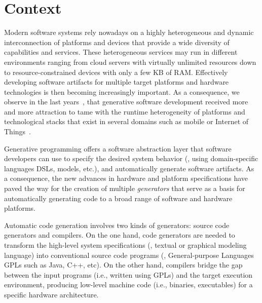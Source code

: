 

\section{Context}
Modern software systems rely nowadays on a highly heterogeneous and dynamic interconnection of platforms and devices that provide a wide diversity of capabilities and services. These heterogeneous services may run in different environments ranging from cloud servers with virtually unlimited resources down to resource-constrained devices with only a few KB of RAM. Effectively developing software artifacts for multiple target platforms and hardware technologies is then becoming increasingly important. As a consequence, we observe in the last years~\cite{Czarnecki:2000:GPM:345203}, that generative software development received more and more attraction to tame with the runtime heterogeneity of platforms and technological stacks that exist in several domains such as mobile or Internet of Things~\cite{betz2011improving}.

Generative programming offers a software abstraction layer that software developers can use to specify the desired system behavior (\eg, using domain-specific languages DSLs, models, etc.), and automatically generate software artifacts. As a consequence, the new advances in hardware and platform specifications have paved the way for the creation of multiple \textit{generators} that serve as a basis for automatically generating code to a broad range of software and hardware platforms. 


Automatic code generation involves two kinds of generators: source code generators and compilers.
On the one hand, code generators are needed to transform the high-level system specifications (\eg, textual or graphical modeling language) into conventional source code programs (\eg, General-purpose Languages GPLs such as Java, C++, etc). 
On the other hand, compilers bridge the gap between the input programs (i.e., written using GPLs) and the target execution environment, producing low-level machine code (i.e., binaries, executables) for a specific hardware architecture.


